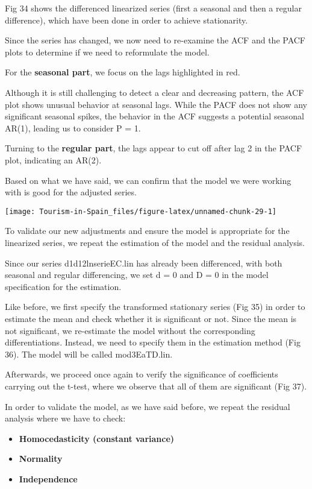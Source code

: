 \documentclass[
]{article}
\begin{document}
Fig 34 shows the differenced linearized series (first a seasonal and
then a regular difference), which have been done in order to achieve
stationarity.

Since the series has changed, we now need to re-examine the ACF and the
PACF plots to determine if we need to reformulate the model.

For the \textbf{seasonal part}, we focus on the lags highlighted in red.

Although it is still challenging to detect a clear and decreasing
pattern, the ACF plot shows unusual behavior at seasonal lags. While the
PACF does not show any significant seasonal spikes, the behavior in the
ACF suggests a potential seasonal AR(1), leading us to consider P = 1.

Turning to the \textbf{regular part}, the lags appear to cut off after
lag 2 in the PACF plot, indicating an AR(2).

Based on what we have said, we can confirm that the model we were
working with is good for the adjusted series.

\begin{center}\texttt{[image: Tourism-in-Spain\_files/figure-latex/unnamed-chunk-29-1]} \end{center}

To validate our new adjustments and ensure the model is appropriate for
the linearized series, we repeat the estimation of the model and the
residual analysis.

Since our series d1d12lnserieEC.lin has already been differenced, with
both seasonal and regular differencing, we set d = 0 and D = 0 in the
model specification for the estimation.

Like before, we first specify the transformed stationary series (Fig 35)
in order to estimate the mean and check whether it is significant or
not. Since the mean is not significant, we re-estimate the model without
the corresponding differentiations. Instead, we need to specify them in
the estimation method (Fig 36). The model will be called mod3EaTD.lin.

Afterwards, we proceed once again to verify the significance of
coefficients carrying out the t-test, where we observe that all of them
are significant (Fig 37).

In order to validate the model, as we have said before, we repeat the
residual analysis where we have to check:

\begin{itemize}
\item
  \textbf{Homocedasticity (constant variance)}
\item
  \textbf{Normality}
\item
  \textbf{Independence}
\end{itemize}
\end{document}
